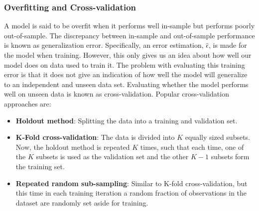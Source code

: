 \documentclass[xcolor=dvipsnames, english, 8pt]{beamer}
\begin{document}
       \begin{frame}
            \frametitle{Overfitting and Cross-validation}
              A model is said to be {\color{ubRed}overfit} when it performs well in-sample but performs poorly out-of-sample. The discrepancy between in-sample and out-of-sample performance is known as generalization error. Specifically, an error estimation, $\hat{\epsilon}$, is made for the model when training. However, this only gives us an idea about how well our model does on data used to train it. The problem with evaluating this training error is that it does not give an indication of how well the model will generalize to an independent and unseen data set. Evaluating whether the model performs well on unseen data is known as {\color{ubRed}cross-validation}. Popular cross-validation approaches are:\vspace{0.25cm}\\
             \begin{itemize}
                     \item {\textbf{\color{ubRed}Holdout method}:} Splitting the data into a training and validation set.
                     \item {\textbf{\color{ubRed}K-Fold cross-validation}:} The data is divided into $K$ equally sized subsets. Now, the holdout method is repeated $K$ times, such that each time, one of the $K$ subsets is used as the validation set and the other $K-1$ subsets form the training set.
                     \item {\textbf{\color{ubRed}Repeated random sub-sampling}:} Similar to K-fold cross-validation, but this time in each training iteration a random fraction of observations in the dataset are randomly set aside for training. \vspace{0.25cm}\\
             \end{itemize}
        \end{frame}
\end{document}
